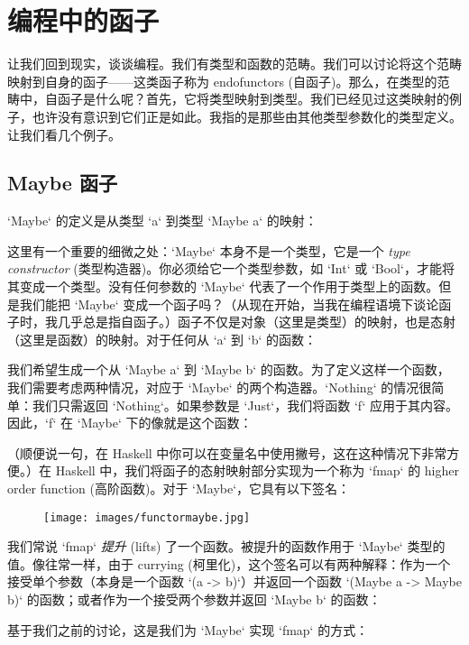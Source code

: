 \section{编程中的函子}

让我们回到现实，谈谈编程。我们有类型和函数的范畴。我们可以讨论将这个范畴映射到自身的函子——这类函子称为 endofunctors (自函子)。那么，在类型的范畴中，自函子是什么呢？首先，它将类型映射到类型。我们已经见过这类映射的例子，也许没有意识到它们正是如此。我指的是那些由其他类型参数化的类型定义。让我们看几个例子。

\subsection{Maybe 函子}

`Maybe` 的定义是从类型 `a` 到类型 `Maybe a` 的映射：

这里有一个重要的细微之处：`Maybe` 本身不是一个类型，它是一个 \emph{type constructor} (类型构造器)。你必须给它一个类型参数，如 `Int` 或 `Bool`，才能将其变成一个类型。没有任何参数的 `Maybe` 代表了一个作用于类型上的函数。但是我们能把 `Maybe` 变成一个函子吗？（从现在开始，当我在编程语境下谈论函子时，我几乎总是指自函子。）函子不仅是对象（这里是类型）的映射，也是态射（这里是函数）的映射。对于任何从 `a` 到 `b` 的函数：

我们希望生成一个从 `Maybe a` 到 `Maybe b` 的函数。为了定义这样一个函数，我们需要考虑两种情况，对应于 `Maybe` 的两个构造器。`Nothing` 的情况很简单：我们只需返回 `Nothing`。如果参数是 `Just`，我们将函数 `f` 应用于其内容。因此，`f` 在 `Maybe` 下的像就是这个函数：

（顺便说一句，在 Haskell 中你可以在变量名中使用撇号，这在这种情况下非常方便。）在 Haskell 中，我们将函子的态射映射部分实现为一个称为 `fmap` 的 higher order function (高阶函数)。对于 `Maybe`，它具有以下签名：


\begin{figure}[H]
  \centering
  \texttt{[image: images/functormaybe.jpg]}
\end{figure}

\noindent
我们常说 `fmap` \emph{提升} (lifts) 了一个函数。被提升的函数作用于 `Maybe` 类型的值。像往常一样，由于 currying (柯里化)，这个签名可以有两种解释：作为一个接受单个参数（本身是一个函数 `(a -> b)`）并返回一个函数 `(Maybe a -> Maybe b)` 的函数；或者作为一个接受两个参数并返回 `Maybe b` 的函数：

基于我们之前的讨论，这是我们为 `Maybe` 实现 `fmap` 的方式：

